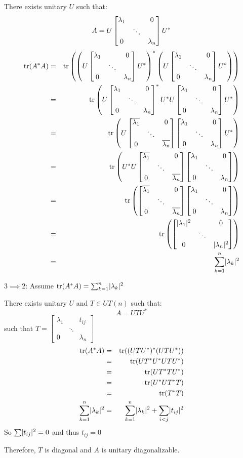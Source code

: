 \documentclass[letterpaper,12pt,fleqn]{article}
\renewcommand{\l}{\lambda}
\newcommand{\conj}[1]{\overline{#1}}
\DeclareMathOperator{\tr}{tr}
\begin{document}
\begin{theproof}
\begin{description}
    \newcommand{\mdct}{\begin{bmatrix}
        \conj{\l_1} & & 0 \\ & \ddots & \\ 0 & & \conj{\l_n}
    \end{bmatrix}}

    \newcommand{\mdn}{\begin{bmatrix}
        \abs{\l_1}^2 & & 0 \\ & \ddots & \\ 0 & & \abs{\l_n}^2
    \end{bmatrix}}
    
    There exists unitary $U$ such that:
    \[A=U\md U^*\]
    \begin{eqnarray*}
      \tr(A^*A) &=&
      \tr\left(\left(U\md U^*\right)^*\left(U\md U^*\right)\right) \\
      &=& \tr\left(U\md^*U^*U\md U^*\right) \\
      &=& \tr\left(U\mdct\md U^*\right) \\
      &=& \tr\left(U^*U\mdct\md\right) \\
      &=& \tr\left(\mdct\md\right) \\
      &=& \tr\left(\mdn\right) \\
      &=& \sum_{k=1}^n\abs{\l_k}^2
    \end{eqnarray*}

  \item $3\implies2$: Assume $\tr(A^*A)=\sum_{k=1}^n\abs{\l_k}^2$

    There exists unitary $U$ and $T\in UT(n)$ such that:
    \[A=UTU^*\]
    such that $T=\begin{bmatrix} \l_1 & & t_{ij} \\ & \ddots & \\ 0 & & \l_n
    \end{bmatrix}$
    \begin{eqnarray*}
      \tr(A^*A) &=& \tr((UTU^*)^*(UTU^*)) \\
      &=& \tr(UT^*U^*UTU^*) \\
      &=& \tr(UT^*TU^*) \\
      &=& \tr(U^*UT^*T) \\
      &=& \tr(T^*T) \\
      \sum_{k=1}^n\abs{\l_k}^2 &=&
      \sum_{k=1}^n\abs{\l_k}^2+\sum_{i<j}\abs{t_{ij}}^2
    \end{eqnarray*}
    So $\sum\lvert t_{ij}\rvert^2=0$ and thus $t_{ij}=0$

    Therefore, $T$ is diagonal and $A$ is unitary diagonalizable.
  \end{description}
\end{theproof}
\end{document}
